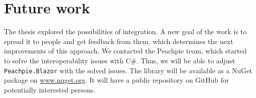 \section{Future work}

The thesis explored the possibilities of integration.
A new goal of the work is to spread it to people and get feedback from them, which determines the next improvements of this approach.
We contacted the Peachpie team, which started to solve the interoperability issues with C\#.
Thus, we will be able to adjust \texttt{Peachpie.Blazor} with the solved issues.
The library will be available as a NuGet package on \url{www.nuget.org}. It will have a public repository on GitHub for potentially interested persons.


